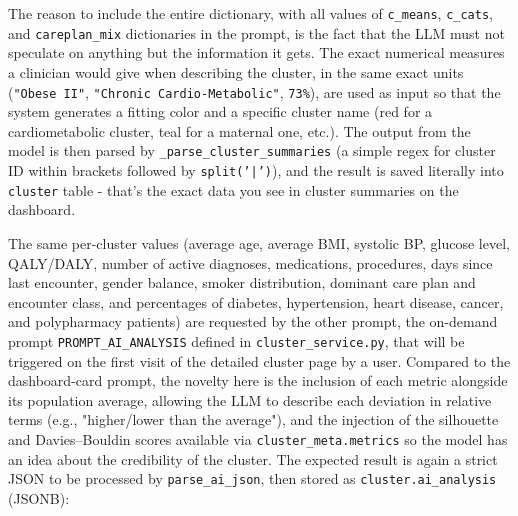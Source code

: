 The reason to include the entire dictionary, with all values of \texttt{c\_means}, \texttt{c\_cats}, and \texttt{careplan\_mix} dictionaries in the prompt, is the fact that the LLM must not speculate on anything but the information it gets. The exact numerical measures a clinician would give when describing the cluster, in the same exact units (\texttt{"Obese II"}, \texttt{"Chronic Cardio-Metabolic"}, \texttt{73\%}), are used as input so that the system generates a fitting color and a specific cluster name (red for a cardiometabolic cluster, teal for a maternal one, etc.). The output from the model is then parsed by \texttt{\_parse\_cluster\_summaries} (a simple regex for cluster ID within brackets followed by \texttt{split('|')}), and the result is saved literally into \texttt{cluster} table - that's the exact data you see in cluster summaries on the dashboard.

The same per-cluster values (average age, average BMI, systolic BP, glucose level, QALY/DALY, number of active diagnoses, medications, procedures, days since last encounter, gender balance, smoker distribution, dominant care plan and encounter class, and percentages of diabetes, hypertension, heart disease, cancer, and polypharmacy patients) are requested by the other prompt, the on-demand prompt \texttt{PROMPT\_AI\_ANALYSIS} defined in \texttt{cluster\_service.py}, that will be triggered on the first visit of the detailed cluster page by a user. Compared to the dashboard-card prompt, the novelty here is the inclusion of each metric alongside its population average, allowing the LLM to describe each deviation in relative terms (e.g., "higher/lower than the average"), and the injection of the silhouette and Davies--Bouldin scores available via \texttt{cluster\_meta.metrics} so the model has an idea about the credibility of the cluster. The expected result is again a strict JSON to be processed by \texttt{parse\_ai\_json}, then stored as \texttt{cluster.ai\_analysis} (JSONB):

